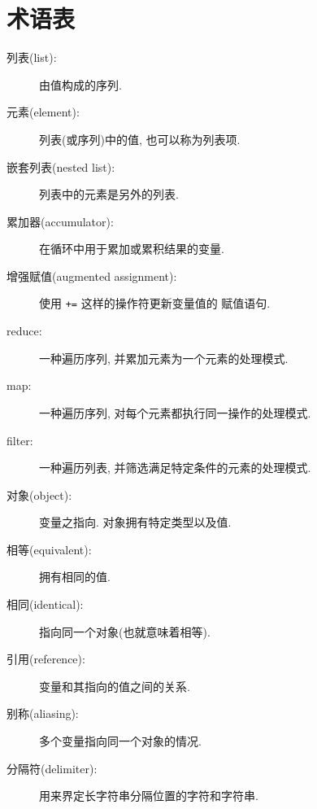 \documentclass[10pt]{book}
\begin{document}
\section{术语表}

\begin{description}

\item[列表(list):] 由值构成的序列. 

\item[元素(element):] 列表(或序列)中的值, 也可以称为列表项.

\item[嵌套列表(nested list):] 列表中的元素是另外的列表. 

\item[累加器(accumulator):] 在循环中用于累加或累积结果的变量.

\item[增强赋值(augmented assignment):] 使用 \verb"+=" 这样的操作符更新变量值的
赋值语句.

\item[reduce:] 一种遍历序列, 并累加元素为一个元素的处理模式.

\item[map:] 一种遍历序列, 对每个元素都执行同一操作的处理模式.

\item[filter:] 一种遍历列表, 并筛选满足特定条件的元素的处理模式.

\item[对象(object):] 变量之指向. 对象拥有特定类型以及值.

\item[相等(equivalent):] 拥有相同的值.

\item[相同(identical):] 指向同一个对象(也就意味着相等).

\item[引用(reference):] 变量和其指向的值之间的关系.

\item[别称(aliasing):] 多个变量指向同一个对象的情况.

\item[分隔符(delimiter):] 用来界定长字符串分隔位置的字符和字符串.

\end{description}
\end{document}
